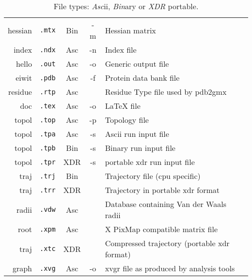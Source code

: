 \begin{table}[p]
\begin{tabularx}{\linewidth}{rlccX}
hessian & {\tt .mtx} & Bin & -m & Hessian matrix \\
  index & {\tt .ndx} & Asc & -n & Index file \\
  hello & {\tt .out} & Asc & -o & Generic output file \\
  eiwit & {\tt .pdb} & Asc & -f & Protein data bank file \\
residue & {\tt .rtp} & Asc &    & Residue Type file used by pdb2gmx \\
    doc & {\tt .tex} & Asc & -o & LaTeX file \\
  topol & {\tt .top} & Asc & -p & Topology file \\
  topol & {\tt .tpa} & Asc & -s & Ascii run input file \\
  topol & {\tt .tpb} & Bin & -s & Binary run input file \\
  topol & {\tt .tpr} & XDR & -s & portable xdr run input file \\
   traj & {\tt .trj} & Bin &    & Trajectory file (cpu specific) \\
   traj & {\tt .trr} & XDR &    & Trajectory in portable xdr format \\
  radii & {\tt .vdw} & Asc &    & Database containing Van der Waals radii \\
   root & {\tt .xpm} & Asc &    & X PixMap compatible matrix file \\
   traj & {\tt .xtc} & XDR &    & Compressed trajectory (portable xdr format)\\
  graph & {\tt .xvg} & Asc & -o & xvgr file as produced by analysis tools \\
\hline
\end{tabularx}
\caption{File types: {\em Asc\/}ii, {\em Bin\/}ary or {\em XDR\/} portable.}
\label{Tab:form}
\end{table}
